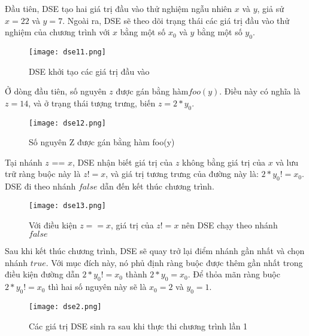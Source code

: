 Đầu tiên, DSE tạo hai giá trị đầu vào thử nghiệm ngẫu nhiên $x$ và $y$, giả sử $x = 22$ và $y = 7$. Ngoài ra, DSE sẽ theo dõi trạng thái các giá trị đầu vào thử nghiệm của chương trình với $x$ bằng một số $x_{0}$ và $y$ bằng một số $y_{0}$.
\begin{center}
	\begin{figure}[H]
		\begin{center}
			\texttt{[image: dse11.png]}
		\end{center}
		\caption{DSE khởi tạo các giá trị đầu vào}
		\label{dse11}
	\end{figure}
\end{center}
Ở dòng đầu tiên, số nguyên $z$ được gán bằng hàm$foo(y)$. Điều này có nghĩa là $z = 14$, và ở trạng thái tượng trưng, biến $ z = 2*y_{0} $. 
\begin{center}
	\begin{figure}[H]
		\begin{center}
			\texttt{[image: dse12.png]}
		\end{center}
		\caption{Số nguyên Z được gán bằng hàm foo(y)}
		\label{dse12}
	\end{figure}
\end{center}

Tại nhánh $z$ == $x$, DSE nhận biết giá trị của $z$ không bằng giá trị của $x$ và lưu trữ ràng buộc này là $z != x$, và giá trị tương trưng của đường này là: $ 2*y_{0} != x_{0} $. DSE đi theo nhánh $false$ dẫn đến kết thúc chương trình.
\begin{center}
	\begin{figure}[H]
		\begin{center}
			\texttt{[image: dse13.png]}
		\end{center}
		\caption{Với điều kiện $z == x$, giá trị của  $z != x$ nên DSE chạy theo nhánh $false$  }
		\label{dse13}
	\end{figure}
\end{center}

Sau khi kết thúc chương trình, DSE sẽ quay trở lại điểm nhánh gần nhất và chọn nhánh $true$. Với mục đích này, nó phủ định ràng buộc được thêm gần nhất trong điều kiện đường dẫn $2*y_{0} != x_{0}$ thành $2*y_{0} = x_{0}$. Để thỏa mãn ràng buộc  $2*y_{0} != x_{0}$  thì hai số nguyên này sẽ là $x_{0} = 2$ và $ y_{0} = 1$.

\begin{center}
	\begin{figure}[H]
		\begin{center}
			\texttt{[image: dse2.png]}
		\end{center}
		\caption{Các giá trị DSE sinh ra sau khi thực thi chương trình lần 1}
		\label{dse2}
	\end{figure}
\end{center}

